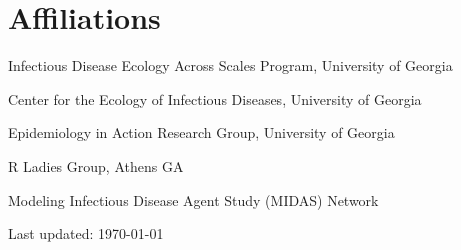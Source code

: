 \documentclass[letterpaper]{article}
\def\footerlink{}
\renewenvironment{itemize}{
  \begin{list}{}{
    \setlength{\leftmargin}{1.5em}
  }
}{
  \end{list}
}
\begin{document}
\section*{Affiliations}
\begin{itemize}
\item  Infectious Disease Ecology Across Scales Program, University of Georgia  
\item Center for the Ecology of Infectious Diseases, University of Georgia 
\item Epidemiology in Action Research Group, University of Georgia 
\item R Ladies Group, Athens GA 
\item Modeling Infectious Disease Agent Study (MIDAS) Network

\end{itemize}

\bigskip

\begin{center}
  \begin{footnotesize}
    Last updated: \today \\
    \href{\footerlink}{\texttt{\footerlink}}
  \end{footnotesize}
\end{center}
\end{document}

